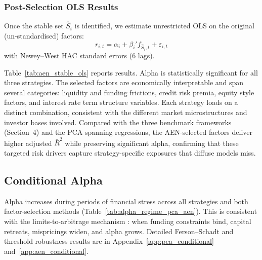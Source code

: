 

\subsubsection{Post-Selection OLS Results}
\label{sec:aen_results}

Once the stable set $\hat{S}_i$ is identified, we estimate unrestricted
OLS on the original (un-standardised) factors:
\[
r_{i,t} = \alpha_i + \beta_i' f_{\hat{S}_i,t} + \varepsilon_{i,t}
\]
with Newey--West HAC standard errors (6 lags).

Table~\ref{tab:aen_stable_ols} reports results. Alpha is statistically
significant for all three strategies. The selected factors are
economically interpretable and span several categories: liquidity and
funding frictions, credit risk premia, equity style factors, and
interest rate term structure variables. Each strategy loads on a
distinct combination, consistent with the different market
microstructures and investor bases involved. Compared with the three
benchmark frameworks (Section~4) and the PCA spanning regressions,
the AEN-selected factors deliver higher adjusted $\bar{R}^2$ while
preserving significant alpha, confirming that these targeted risk
drivers capture strategy-specific exposures that diffuse models miss.




\subsection{Conditional Alpha}
\label{sec:conditional_alpha}

Alpha increases during periods of financial stress across all strategies
and both factor-selection methods (Table~\ref{tab:alpha_regime_pca_aen}).
This is consistent with the limits-to-arbitrage mechanism
\citep{duffie2010presidential, mitchell2007slow}: when funding constraints
bind, capital retreats, mispricings widen, and alpha grows. Detailed
Ferson--Schadt and threshold robustness results are in
Appendix~\ref{app:pca_conditional} and~\ref{app:aen_conditional}.

